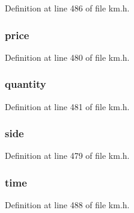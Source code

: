 Definition at line 486 of file km.\+h.

\subsubsection[{\texorpdfstring{price}{price}}]{ price}\hypertarget{struct_k_1_1m_order_a96d6f95b2441f538965c5d8c1aa32f4e}{}\label{struct_k_1_1m_order_a96d6f95b2441f538965c5d8c1aa32f4e}


Definition at line 480 of file km.\+h.

\subsubsection[{\texorpdfstring{quantity}{quantity}}]{ quantity}\hypertarget{struct_k_1_1m_order_ab51872d3926e8302926e8ac851dbb158}{}\label{struct_k_1_1m_order_ab51872d3926e8302926e8ac851dbb158}


Definition at line 481 of file km.\+h.

\subsubsection[{\texorpdfstring{side}{side}}]{ side}\hypertarget{struct_k_1_1m_order_afc5924267a11b19eb2f198a919a12351}{}\label{struct_k_1_1m_order_afc5924267a11b19eb2f198a919a12351}


Definition at line 479 of file km.\+h.

\subsubsection[{\texorpdfstring{time}{time}}]{ time}\hypertarget{struct_k_1_1m_order_a8c7be9fac36539b28a92dd5240ec377b}{}\label{struct_k_1_1m_order_a8c7be9fac36539b28a92dd5240ec377b}


Definition at line 488 of file km.\+h.

